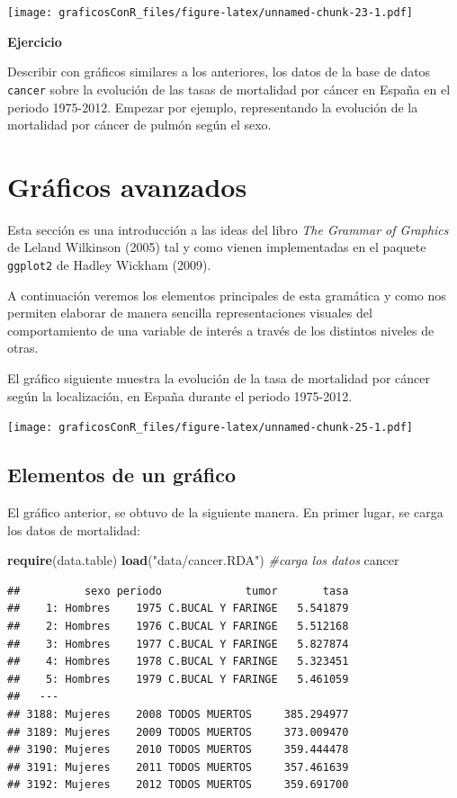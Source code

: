 \documentclass[]{article}
\newenvironment{Shaded}{\begin{snugshade}}{\end{snugshade}}
\newcommand{\CommentTok}[1]{\textcolor[rgb]{0.56,0.35,0.01}{\textit{#1}}}
\newcommand{\KeywordTok}[1]{\textcolor[rgb]{0.13,0.29,0.53}{\textbf{#1}}}
\newcommand{\NormalTok}[1]{#1}
\newcommand{\StringTok}[1]{\textcolor[rgb]{0.31,0.60,0.02}{#1}}
\newcounter{ejcnt}[section]
\numberwithin{ejcnt}{section}
\newenvironment{ej}[1][]{%
	\refstepcounter{ejcnt}%
	\par\medskip%
	\noindent%
	\textbf{Ejercicio \theejcnt \;\;}%
	\rmfamily%
}{\medskip}
\begin{document}
\texttt{[image: graficosConR\_files/figure-latex/unnamed-chunk-23-1.pdf]}

\begin{ej}
Describir con gráficos similares a los anteriores, los datos de la base
de datos \texttt{cancer} sobre la evolución de las tasas de mortalidad
por cáncer en España en el periodo 1975-2012. Empezar por ejemplo,
representando la evolución de la mortalidad por cáncer de pulmón según
el sexo.
\end{ej}

\hypertarget{graficos-avanzados}{%
\section{Gráficos avanzados}\label{graficos-avanzados}}

Esta sección es una introducción a las ideas del libro \emph{The Grammar of Graphics} de Leland Wilkinson (2005) tal y como vienen implementadas en el paquete \texttt{ggplot2} de Hadley Wickham (2009).

A continuación veremos los elementos principales de esta gramática y como nos permiten elaborar de manera sencilla representaciones visuales del comportamiento de una variable de interés a través de los distintos niveles de otras.

El gráfico siguiente muestra la evolución de la tasa de mortalidad por cáncer según la localización, en España durante el periodo 1975-2012.

\texttt{[image: graficosConR\_files/figure-latex/unnamed-chunk-25-1.pdf]}

\hypertarget{elementos-de-un-grafico}{%
\subsection{Elementos de un gráfico}\label{elementos-de-un-grafico}}

El gráfico anterior, se obtuvo de la siguiente manera. En primer lugar, se carga los datos de mortalidad:

\begin{Shaded}
\begin{Highlighting}[]
\KeywordTok{require}\NormalTok{(data.table)}
\KeywordTok{load}\NormalTok{(}\StringTok{"data/cancer.RDA"}\NormalTok{) }\CommentTok{#carga los datos}
\NormalTok{cancer}
\end{Highlighting}
\end{Shaded}

\begin{verbatim}
##          sexo periodo             tumor       tasa
##    1: Hombres    1975 C.BUCAL Y FARINGE   5.541879
##    2: Hombres    1976 C.BUCAL Y FARINGE   5.512168
##    3: Hombres    1977 C.BUCAL Y FARINGE   5.827874
##    4: Hombres    1978 C.BUCAL Y FARINGE   5.323451
##    5: Hombres    1979 C.BUCAL Y FARINGE   5.461059
##   ---                                             
## 3188: Mujeres    2008 TODOS MUERTOS     385.294977
## 3189: Mujeres    2009 TODOS MUERTOS     373.009470
## 3190: Mujeres    2010 TODOS MUERTOS     359.444478
## 3191: Mujeres    2011 TODOS MUERTOS     357.461639
## 3192: Mujeres    2012 TODOS MUERTOS     359.691700
\end{verbatim}
\end{document}
